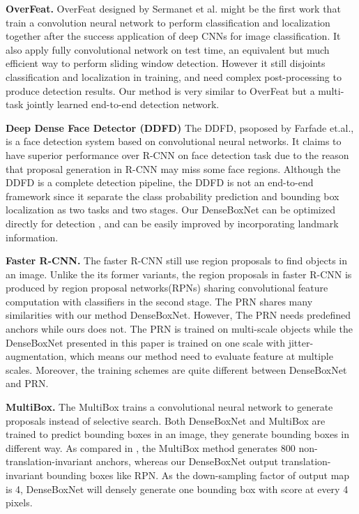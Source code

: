 \textbf{OverFeat.} OverFeat\cite{sermanet2013overfeat} designed by Sermanet et al. might be the first work that train a convolution neural network to perform classification and localization together after the success application of deep CNNs for image classification\cite{krizhevsky2012imagenet}. It also apply fully convolutional network on test time, an equivalent but much efficient way to perform sliding window detection. However it still disjoints classification and localization in training, and need complex post-processing to produce detection results. Our method is very similar to OverFeat but a multi-task jointly learned end-to-end detection network. 

\textbf{Deep Dense Face Detector (DDFD)} The DDFD, psoposed by Farfade et.al.\cite{farfade2015multi},  is a face detection system based on convolutional neural networks. It claims to have superior performance over R-CNN on face detection task due to the reason that proposal generation in R-CNN may miss some face regions.  Although the DDFD is a complete detection pipeline,  the DDFD is not an end-to-end framework since it separate the class probability prediction and bounding box localization as two tasks and two stages.  Our DenseBoxNet can be optimized directly for detection , and can be easily improved by incorporating landmark information. 

\textbf{Faster R-CNN.} The faster R-CNN\cite{ren2015faster} still use region proposals to find objects in an image. Unlike the its former variants, the region proposals in faster R-CNN is produced by region proposal networks(RPNs) sharing convolutional feature computation with classifiers in the second stage. The PRN shares many similarities with our method DenseBoxNet. However, The PRN needs predefined anchors while ours does not. The PRN is trained on multi-scale objects while the DenseBoxNet presented in this paper is trained on one scale with jitter-augmentation, which means our method need to evaluate feature at multiple scales. Moreover, the training schemes are quite different between DenseBoxNet and PRN. 

\textbf{MultiBox.} The MultiBox\cite{erhan2014scalable} trains a convolutional neural network to generate proposals instead of selective search. Both DenseBoxNet and MultiBox are trained to predict bounding boxes in an image, they generate bounding boxes in different way.  As compared in \cite{ren2015faster} , the MultiBox method generates 800 non-translation-invariant anchors, whereas our DenseBoxNet output translation-invariant bounding boxes like RPN. As the down-sampling factor of output map is 4,  DenseBoxNet will densely generate one bounding box with score at every 4 pixels. 

